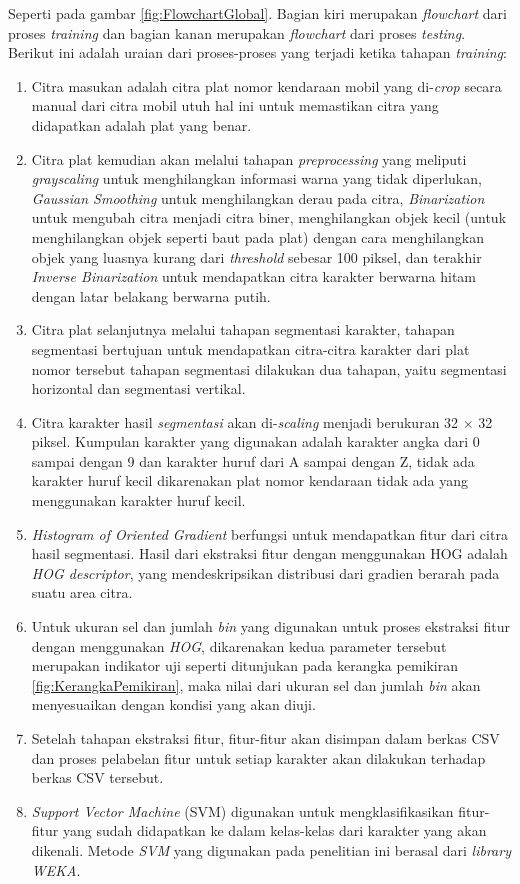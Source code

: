 \noindent Seperti pada gambar \ref{fig:FlowchartGlobal}. Bagian kiri merupakan \textit{flowchart} dari proses \textit{training} dan bagian kanan merupakan \textit{flowchart} dari proses \textit{testing}. Berikut ini adalah uraian dari proses-proses yang terjadi ketika tahapan \textit{training}:
\begin{enumerate}
	\item Citra masukan adalah citra plat nomor kendaraan mobil yang di-\textit{crop} secara manual dari citra mobil utuh hal ini untuk memastikan citra yang didapatkan adalah plat yang benar. 
	\item Citra plat kemudian akan melalui tahapan \textit{preprocessing} yang meliputi \textit{grayscaling} untuk menghilangkan informasi warna yang tidak diperlukan, \textit{Gaussian Smoothing} untuk menghilangkan derau pada citra, \textit{Binarization} untuk mengubah citra menjadi citra biner, menghilangkan objek kecil (untuk menghilangkan objek seperti baut pada plat) dengan cara menghilangkan objek yang luasnya kurang dari \textit{threshold} sebesar 100 piksel, dan terakhir \textit{Inverse Binarization} untuk mendapatkan citra karakter berwarna hitam dengan latar belakang berwarna putih.
	\item Citra plat selanjutnya melalui tahapan segmentasi karakter, tahapan segmentasi bertujuan untuk mendapatkan citra-citra karakter dari plat nomor tersebut tahapan segmentasi dilakukan dua tahapan, yaitu segmentasi horizontal dan segmentasi vertikal.
	\item Citra karakter hasil \textit{segmentasi} akan di-\textit{scaling} menjadi berukuran 32 $\times$ 32 piksel. Kumpulan karakter yang digunakan adalah karakter angka dari 0 sampai dengan 9 dan karakter huruf dari A sampai dengan Z, tidak ada karakter huruf kecil dikarenakan plat nomor kendaraan tidak ada yang menggunakan karakter huruf kecil.
	\item \textit{Histogram of Oriented Gradient} berfungsi untuk mendapatkan fitur dari citra hasil segmentasi. Hasil dari ekstraksi fitur dengan menggunakan HOG adalah \textit{HOG descriptor}, yang mendeskripsikan distribusi dari gradien berarah pada suatu area citra.
	\item Untuk ukuran sel dan jumlah \textit{bin} yang digunakan untuk proses ekstraksi fitur dengan menggunakan \textit{HOG}, dikarenakan kedua parameter tersebut merupakan indikator uji seperti ditunjukan pada kerangka pemikiran \ref{fig:KerangkaPemikiran}, maka nilai dari ukuran sel dan jumlah \textit{bin} akan menyesuaikan dengan kondisi yang akan diuji.
	\item Setelah tahapan ekstraksi fitur, fitur-fitur akan disimpan dalam berkas CSV dan proses pelabelan fitur untuk setiap karakter akan dilakukan terhadap berkas CSV tersebut.
	\item \textit{Support Vector Machine} (SVM) digunakan untuk mengklasifikasikan fitur-fitur yang sudah didapatkan ke dalam kelas-kelas dari karakter yang akan dikenali. Metode \textit{SVM} yang digunakan pada penelitian ini berasal dari \textit{library WEKA}.
\end{enumerate}
